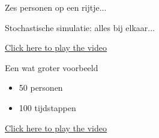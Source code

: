 \documentclass{beamer}
\begin{document}
\begin{frame}{Zes personen op een rijtje...}
\end{frame}



   
\begin{frame}{Stochastische simulatie: alles bij elkaar...}

 \href{run:smallexample.mp4}{Click here to play the video}
	
\end{frame}


\begin{frame}{Een wat groter voorbeeld}
\begin{itemize}
	\item 50 personen
	\item 100 tijdstappen
\end{itemize}	



 \href{run:large_example.mp4}{Click here to play the video}
\end{frame}
\end{document}
